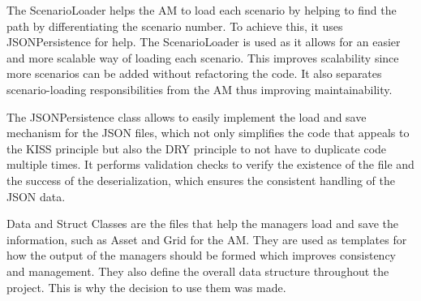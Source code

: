The ScenarioLoader helps the AM to load each scenario by helping to find the path by differentiating the scenario number. To achieve this, it uses JSONPersistence for help. The ScenarioLoader is used as it allows for an easier and more scalable way of loading each scenario. This improves scalability since more scenarios can be added without refactoring the code. It also separates scenario-loading responsibilities from the AM thus improving maintainability.\par

The JSONPersistence class allows to easily implement the load and save mechanism for the JSON files, which not only simplifies the code that appeals to the KISS principle but also the DRY principle to not have to duplicate code multiple times. It performs validation checks to verify the existence of the file and the success of the deserialization, which ensures the consistent handling of the JSON data.\par

Data and Struct Classes are the files that help the managers load and save the information, such as Asset and Grid for the AM. They are used as templates for how the output of the managers should be formed which improves consistency and management. They also define the overall data structure throughout the project. This is why the decision to use them was made.\par


